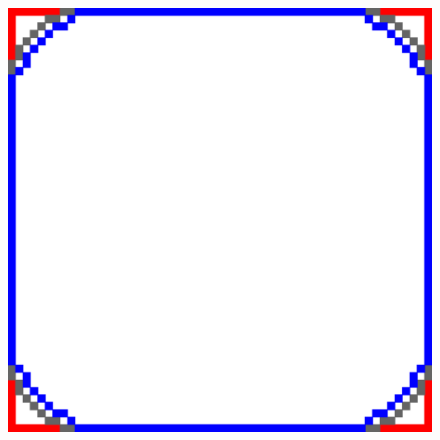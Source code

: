 \documentclass[smallextended]{svjour3}       %
\begin{document}
{\begin{figure}[hp!]
{{		\includegraphics[scale=0.15]{images/flow/grid-radius-effect/square/r3-h0.5/summary_flow.eps}}%
		\hspace{15pt}
		}		
	

\end{figure}}
\end{document}
